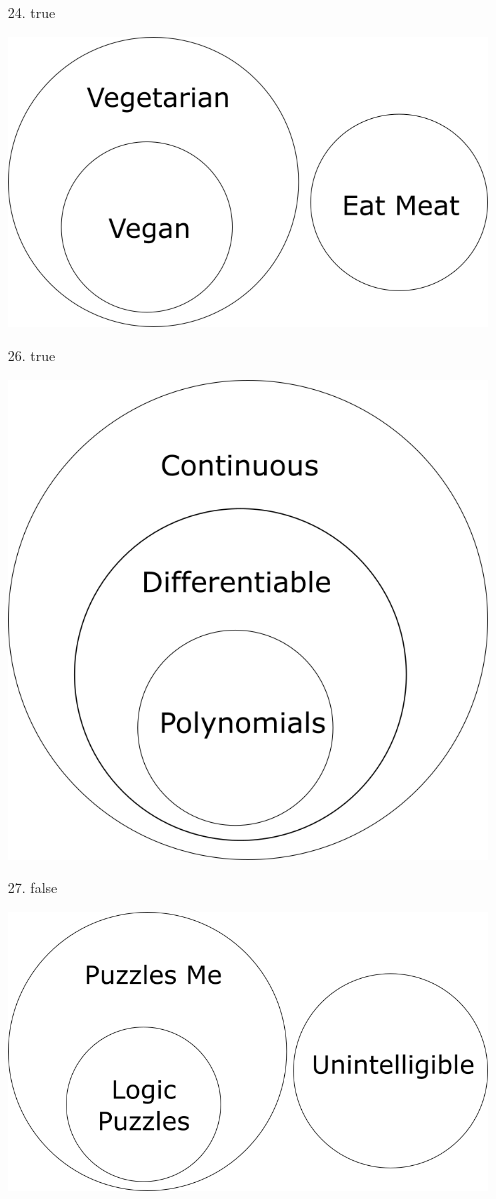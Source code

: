 \documentclass[12pt]{article}
\begin{document}
\begin{itemize}
    \item [24.] true
    \item [] \includegraphics[scale = 0.3]{8-24.png}

    
    \item [26.] true
    \item [] \includegraphics[scale = 0.3]{8-26.png}

    
    \item [27.] false
    \item [] \includegraphics[scale = 0.3]{8-27.png}

    
\end{itemize}
\end{document}
